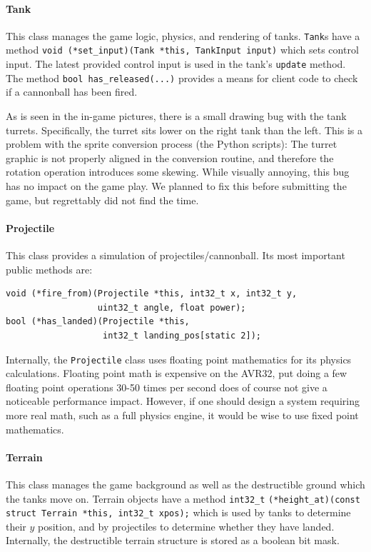 \documentclass[a4paper,10pt]{article}
\newcommand{\isrc}[1]{\texttt{#1}}
\begin{document}
\paragraph{Tank} This class manages the game logic, physics, and rendering of
tanks. \isrc{Tank}s have a method \isrc{void (*set\_input)(Tank *this,
TankInput input)} which sets control input.  The latest provided control input
is used in the tank's \isrc{update} method. The method \isrc{bool
has\_released(...)} provides a means for client code to check if a cannonball
has been fired.

{\small
As is seen in the in-game pictures, there is a small drawing bug with the tank
turrets. Specifically, the turret sits lower on the right tank than the left.
This is a problem with the sprite conversion process (the Python scripts): The
turret graphic is not properly aligned in the conversion routine, and
therefore the rotation operation introduces some skewing. While visually
annoying, this bug has no impact on the game play. We planned to fix this
before submitting the game, but regrettably did not find the time.
}

\paragraph{Projectile} This class provides a simulation of
projectiles/cannonball. Its most important public methods are:
\begin{lstlisting}
void (*fire_from)(Projectile *this, int32_t x, int32_t y, 
                  uint32_t angle, float power);
bool (*has_landed)(Projectile *this, 
                   int32_t landing_pos[static 2]);
\end{lstlisting}
Internally, the \isrc{Projectile} class uses floating point mathematics for
its physics calculations. Floating point math is expensive on the AVR32, put
doing a few floating point operations 30-50 times per second does of course
not give a noticeable performance impact. However, if one should design a
system requiring more real math, such as a full physics engine, it would be
wise to use fixed point mathematics.

\paragraph{Terrain} This class manages the game background as well as the
destructible ground which the tanks move on. Terrain objects have a method
\isrc{int32\_t} \isrc{(*height\_at)(const struct Terrain *this, int32\_t
xpos);} which is used by tanks to determine their $y$ position, and by
projectiles to determine whether they have landed. Internally, the
destructible terrain structure is stored as a boolean bit mask. 
\end{document}
